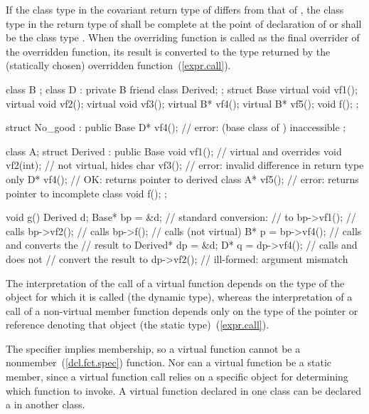 \pnum
If the class type in the covariant return type of  differs from that of
, the class type in the return type of  shall be
complete at the point of declaration of  or shall be the
class type . When the overriding function is called as the
final overrider of the overridden function, its result is converted to
the type returned by the (statically chosen) overridden
function~(\ref{expr.call}).
\enterexample
{}%
\begin{codeblock}
class B { };
class D : private B { friend class Derived; };
struct Base {
  virtual void vf1();
  virtual void vf2();
  virtual void vf3();
  virtual B*   vf4();
  virtual B*   vf5();
  void f();
};

struct No_good : public Base {
  D*  vf4();        // error:  (base class of ) inaccessible
};

class A;
struct Derived : public Base {
    void vf1();     // virtual and overrides 
    void vf2(int);  // not virtual, hides 
    char vf3();     // error: invalid difference in return type only
    D*  vf4();      // OK: returns pointer to derived class
    A*  vf5();      // error: returns pointer to incomplete class
    void f();
};

void g() {
  Derived d;
  Base* bp = &d;                // standard conversion:
                                //  to 
  bp->vf1();                    // calls 
  bp->vf2();                    // calls 
  bp->f();                      // calls  (not virtual)
  B*  p = bp->vf4();            // calls  and converts the
                                // result to 
  Derived*  dp = &d;
  D*  q = dp->vf4();            // calls  and does not
                                // convert the result to 
  dp->vf2();                    // ill-formed: argument mismatch
}
\end{codeblock}
\exitexample

\pnum
\enternote
The interpretation of the call of a virtual function depends on the type
of the object for which it is called (the dynamic type), whereas the
interpretation of a call of a non-virtual member function depends only
on the type of the pointer or reference denoting that object (the static
type)~(\ref{expr.call}).
\exitnote

\pnum
\enternote
The  specifier implies membership, so a virtual function
cannot be a nonmember~(\ref{dcl.fct.spec}) function. Nor can a virtual
function be a static member, since a virtual function call relies on a
specific object for determining which function to invoke. A virtual
function declared in one class can be declared a  in
another class.
\exitnote

